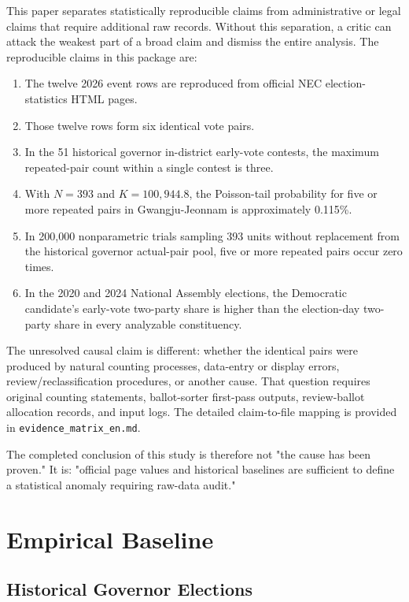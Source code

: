 \documentclass[preprint]{IEIE}
\begin{document}
This paper separates statistically reproducible claims from administrative or legal claims that require additional raw records. Without this separation, a critic can attack the weakest part of a broad claim and dismiss the entire analysis. The reproducible claims in this package are:

\begin{enumerate}
\item The twelve 2026 event rows are reproduced from official NEC election-statistics HTML pages.
\item Those twelve rows form six identical vote pairs.
\item In the 51 historical governor in-district early-vote contests, the maximum repeated-pair count within a single contest is three.
\item With \(N=393\) and \(K=100,944.8\), the Poisson-tail probability for five or more repeated pairs in Gwangju-Jeonnam is approximately 0.115\%.
\item In 200,000 nonparametric trials sampling 393 units without replacement from the historical governor actual-pair pool, five or more repeated pairs occur zero times.
\item In the 2020 and 2024 National Assembly elections, the Democratic candidate's early-vote two-party share is higher than the election-day two-party share in every analyzable constituency.
\end{enumerate}

The unresolved causal claim is different: whether the identical pairs were produced by natural counting processes, data-entry or display errors, review/reclassification procedures, or another cause. That question requires original counting statements, ballot-sorter first-pass outputs, review-ballot allocation records, and input logs. The detailed claim-to-file mapping is provided in \texttt{evidence\_matrix\_en.md}.

The completed conclusion of this study is therefore not "the cause has been proven." It is: "official page values and historical baselines are sufficient to define a statistical anomaly requiring raw-data audit."

\section{Empirical Baseline}

\subsection{Historical Governor Elections}
\end{document}
